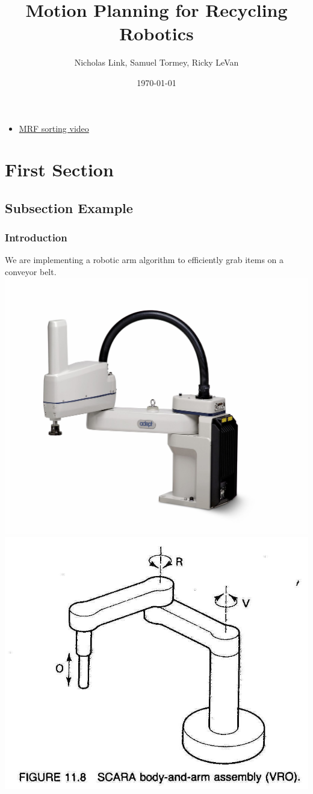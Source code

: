 \documentclass{beamer}
\title[Recycle Robot]{Motion Planning for Recycling Robotics} %
\author[Link, Tormey, LeVan]{Nicholas Link, Samuel Tormey, Ricky LeVan} %
\date{\today} %
\begin{document}
\begin{frame}
\titlepage %

\begin{itemize} 
\item \href{http://www.youtube.com/watch?v=_GP3JuiX5BY&t=5m56s}{{\color{blue} MRF sorting video}}
\end{itemize}

\end{frame}


\section{First Section} %

\subsection{Subsection Example} %

\begin{frame}
\frametitle{Introduction}
We are implementing a robotic arm algorithm to efficiently grab items on a conveyor belt. 
\includegraphics[width=0.55\linewidth,height=0.55\textheight,keepaspectratio]{scara.jpg}
\includegraphics[width=0.55\linewidth,height=0.55\textheight,keepaspectratio]{scara2.jpg}

\end{frame}
\end{document}
